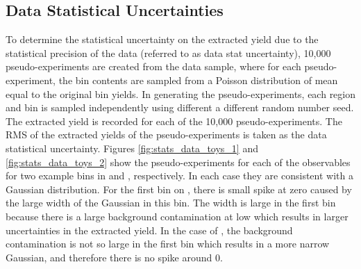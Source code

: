 \subsection{Data Statistical Uncertainties}\label{sec:stat_unc_extraction}

To determine the statistical uncertainty on the extracted \ewwy yield due to the statistical precision of the data (referred to as data stat uncertainty), 10,000 pseudo-experiments are created from the data sample, where for each pseudo-experiment, the bin contents are sampled from a Poisson distribution of mean equal to the original bin yields. In generating the pseudo-experiments, each region and bin is sampled independently using different a different random number seed. The extracted \ewwy yield is recorded for each of the 10,000 pseudo-experiments. The RMS of the extracted \ewwy yields of the pseudo-experiments is taken as the data statistical uncertainty. Figures \ref{fig:stats_data_toys_1} and \ref{fig:stats_data_toys_2} show the pseudo-experiments for each of the observables for two example bins in \mjj and \leppt, respectively. In each case they are consistent with a Gaussian distribution. For the first bin on \mjj, there is small spike at zero caused by the large width of the Gaussian in this bin. The width is large in the first bin because there is a large background contamination at low \mjj which results in larger uncertainties in the extracted \ewwy yield. In the case of \leppt, the background contamination is not so large in the first bin which results in a more narrow Gaussian, and therefore there is no spike around 0.%

